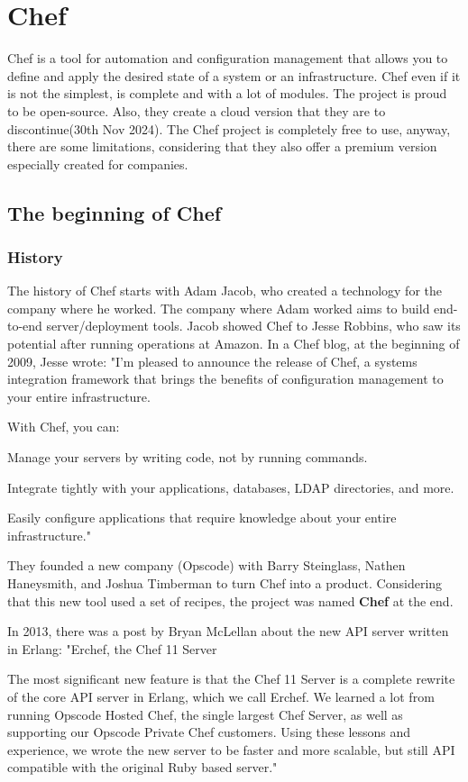 \documentclass[12pt,a4paper,openright,twoside]{book}
\begin{document}
\chapter{Chef}
Chef is a tool for automation and configuration management that allows you to define and apply the desired state of a system or an infrastructure.
Chef even if it is not the simplest, is complete and with a lot of modules. The project is proud to be open-source.
Also, they create a cloud version that they are to discontinue(30th Nov 2024).
The Chef project is completely free to use, anyway, there are some limitations, considering that they also offer a premium version especially created for companies.

\section{The beginning of Chef}

\subsection{History}
The history of Chef starts with Adam Jacob, who created a technology for the company where he worked.
The company where Adam worked aims to build end-to-end server/deployment tools. Jacob showed Chef to Jesse Robbins, who saw its potential after running operations at Amazon.
In a Chef blog, at the beginning of 2009, Jesse wrote:
"I'm pleased to announce the release of Chef, a systems integration framework that brings the benefits of configuration management to your entire infrastructure.

With Chef, you can:

Manage your servers by writing code, not by running commands. 


Integrate tightly with your applications, databases, LDAP directories, and more.


Easily configure applications that require knowledge about your entire infrastructure."
\cite{chefStory}

They founded a new company (Opscode) with Barry Steinglass, Nathen Haneysmith, and Joshua Timberman to turn Chef into a product.
Considering that this new tool used a set of recipes, the project was named \textbf{Chef} at the end.

In 2013, there was a post by Bryan McLellan about the new API server written in Erlang:
"Erchef, the Chef 11 Server


The most significant new feature is that the Chef 11 Server is a complete rewrite of the core API server in Erlang, which we call Erchef.
We learned a lot from running Opscode Hosted Chef, the single largest Chef Server, as well as supporting our Opscode Private Chef customers.
Using these lessons and experience, we wrote the new server to be faster and more scalable, but still API compatible with the original Ruby based server."\cite{chefStory2}
\end{document}
